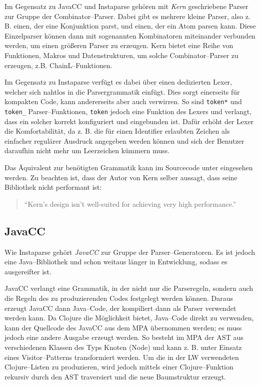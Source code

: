 \documentclass[ngerman,a4paper,abstracton,open=right,twoside=false,toc=listofnumbered,bibtotocnumbered]{scrreprt}
\begin{document}
Im Gegensatz zu JavaCC und Instaparse gehören mit \emph{Kern} geschriebene Parser zur Gruppe der Combinator--Parser. Dabei gibt es mehrere \glqq{}kleine\grqq{} Parser, also z. B. einen, der eine Konjunktion parst, und einen, der ein Atom parsen kann. Diese Einzelparser können dann mit sogenannten Kombinatoren miteinander verbunden werden, um einen größeren Parser zu erzeugen. Kern bietet eine Reihe von Funktionen, Makros und Datenstrukturen, um solche Combinator--Parser zu erzeugen, z.B. ChainL--Funktionen.

Im Gegensatz zu Instaparse verfügt es dabei über einen dedizierten Lexer, welcher sich nahtlos in die Parsergrammatik einfügt. Dies sorgt einerseits für kompakten Code, kann andererseits aber auch verwirren. So sind \lstinline|token*| und \lstinline|token_| Parser--Funktionen, \lstinline|token| jedoch eine Funktion des Lexers und verlangt, dass ein solcher korrekt konfiguriert und eingebunden ist. Dafür erhöht der Lexer die Komfortabilität, da z. B. die für einen Identifier erlaubten Zeichen als einfacher regulärer Ausdruck angegeben werden können und sich der Benutzer daraufhin nicht mehr um Leerzeichen kümmern muss.

Das Äquivalent zur benötigten Grammatik kann im Sourcecode unter \cite{lw} eingesehen werden. Zu beachten ist, dass der Autor von Kern selber aussagt, dass seine Bibliothek nicht performant ist: 

\begin{quote}
	``Kern's design isn't well-suited for achieving very high performance.'' \cite{kern}
\end{quote}

\subsection{JavaCC}\label{JavaCC}

Wie Instaparse gehört \emph{JavaCC} zur Gruppe der Parser--Generatoren. Es ist jedoch eine Java--Bibliothek und schon weitaus länger in Entwicklung, sodass es ausgereifter ist. \cite{javacc}

JavaCC verlangt eine Grammatik, in der nicht nur die Parseregeln, sondern auch die Regeln des zu produzierenden Codes festgelegt werden können. Daraus erzeugt JavaCC dann Java--Code, der kompiliert dann als Parser verwendet werden kann. Da Clojure die Möglichkeit bietet, Java--Code direkt zu verwenden, kann der Quellcode des JavaCC aus dem MPA übernommen werden; es muss jedoch eine andere Ausgabe erzeugt werden. So besteht im MPA der AST aus verschiedenen Klassen des Typs \glqq{}Knoten\grqq{} (Node) und kann z. B. unter Einsatz eines Visitor--Patterns transformiert werden. Um die in der LW verwendeten Clojure--Listen zu produzieren, wird jedoch mittels einer Clojure--Funktion rekursiv durch den AST traversiert und die neue Baumstruktur erzeugt.
\end{document}
